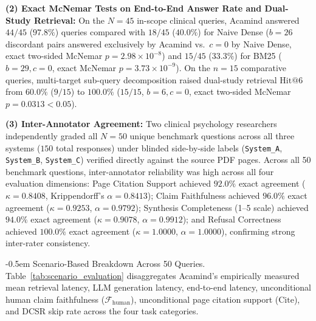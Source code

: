 \documentclass[10pt]{SPIIRAS_Proceedings}
\makeatletter
\renewcommand\subsection{\@startsection{subsection}{2}{\parindent}%
  {\z@}%
  {-0.5em}%
  {\normalfont\normalsize\bfseries}}
\makeatother
\begin{document}
\textbf{(2) Exact McNemar Tests on End-to-End Answer Rate and Dual-Study Retrieval:} On the $N = 45$ in-scope clinical queries, Acamind answered $44/45$ ($97.8\%$) queries compared with $18/45$ ($40.0\%$) for Naive Dense ($b = 26$ discordant pairs answered exclusively by Acamind vs.\ $c = 0$ by Naive Dense, exact two-sided McNemar $p = 2.98 \times 10^{-8}$) and $15/45$ ($33.3\%$) for BM25 ($b = 29, c = 0$, exact McNemar $p = 3.73 \times 10^{-9}$). On the $n = 15$ comparative queries, multi-target sub-query decomposition raised dual-study retrieval $\mathrm{Hit@6}$ from $60.0\%$ ($9/15$) to $100.0\%$ ($15/15$, $b = 6, c = 0$, exact two-sided McNemar $p = 0.0313 < 0.05$).

\textbf{(3) Inter-Annotator Agreement:} Two clinical psychology researchers independently graded all $N = 50$ unique benchmark questions across all three systems ($150$ total responses) under blinded side-by-side labels (\texttt{System\_A}, \texttt{System\_B}, \texttt{System\_C}) verified directly against the source PDF pages. Across all 50 benchmark questions, inter-annotator reliability was high across all four evaluation dimensions: Page Citation Support achieved $92.0\%$ exact agreement ($\kappa = 0.8408$, Krippendorff's $\alpha = 0.8413$); Claim Faithfulness achieved $96.0\%$ exact agreement ($\kappa = 0.9253$, $\alpha = 0.9792$); Synthesis Completeness (1--5 scale) achieved $94.0\%$ exact agreement ($\kappa = 0.9078$, $\alpha = 0.9912$); and Refusal Correctness achieved $100.0\%$ exact agreement ($\kappa = 1.0000$, $\alpha = 1.0000$), confirming strong inter-rater consistency.

\subsection{Scenario-Based Breakdown Across 50 Queries.} Table~\ref{tab:scenario_evaluation} disaggregates Acamind's empirically measured mean retrieval latency, LLM generation latency, end-to-end latency, unconditional human claim faithfulness ($\mathcal{F}_{\mathrm{human}}$), unconditional page citation support ($\mathrm{Cite}$), and DCSR skip rate across the four task categories.
\end{document}
